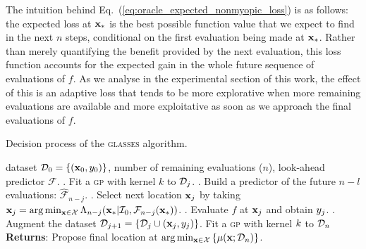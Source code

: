 \documentclass[twoside]{article}
\newcommand{\I}{\mathcal{I}}
\newcommand{\future}{\mathcal{F}}
\newcommand{\acr}[1]{\textsc{#1}\xspace}
\newcommand{\gp}{\acr{gp}}
\newcommand{\us}{\acr{glasses}}
\begin{document}
The intuition behind Eq.~(\ref{eq:oracle_expected_nonmyopic_loss}) is as follows: the expected loss at $\mathbf{x}_*$ is the best possible function value that we expect to find in the next $n$ steps, conditional on the first evaluation being made at $\mathbf{x}_*$. Rather than merely quantifying the benefit provided by the next evaluation, this loss function accounts for the expected gain in the whole future sequence of evaluations of $f$. As we analyse in the experimental section of this work, the effect of this is an adaptive loss that tends to be more explorative when more remaining evaluations are available and more exploitative as soon as we approach the final evaluations of $f$.

\begin{algorithm*}[t!]
   \caption{Decision process of the \us algorithm.}
   \label{alg:glasses}
\begin{algorithmic}
    dataset $\mathcal{D}_{0} = \{(\textbf{x}_0, y_0)\}$, number of remaining evaluations ($n$), look-ahead predictor $\future$.
   . Fit a \gp with kernel $k$ to $\mathcal{D}_{j}$.
   . Build a predictor of the future $n-l$ evaluations: $\hat{\future}_{n-j}$.
   . Select next location $\mathbf{x}_j$ by taking  $\latentVector_j = \arg \min_{\latentVector \in {\mathcal X}}\Lambda_{n-j}(\latentVector_*|\I_0, \future_{n-j}(\latentVector_*))$.
   . Evaluate $f$ at $\mathbf{x}_j$ and obtain $y_j$.
   . Augment the dataset $\mathcal{D}_{j+1} = \{\mathcal{D}_{j} \cup (\textbf{x}_j, y_j)\}$.
   \ENDFOR
   \STATE Fit a \gp with kernel $k$ to $\mathcal{D}_{n}$
   \STATE \textbf{Returns}: Propose final location at $\arg \min_{\mathbf{x} \in \mathcal{X}} \left\{\mu(\mathbf{x}; \mathcal{D}_{n})\right\}$.  
\end{algorithmic}
\end{algorithm*}
\end{document}
